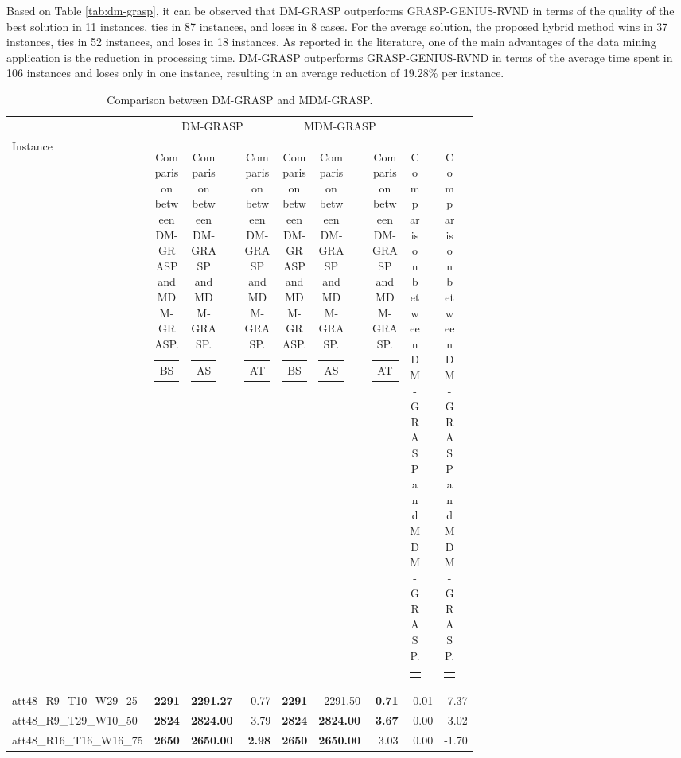 \documentclass{singlecol-new}
\begin{document}
Based on Table \ref{tab:dm-grasp}, it can be observed that DM-GRASP outperforms GRASP-GENIUS-RVND in terms of the quality of the best solution in 11 instances, ties in 87 instances, and loses in 8 cases. For the average solution, the proposed hybrid method wins in 37 instances, ties in 52 instances, and loses in 18 instances. As reported in the literature, one of the main advantages of the data mining application is the reduction in processing time. DM-GRASP outperforms GRASP-GENIUS-RVND in terms of the average time spent in 106 instances and loses only in one instance, resulting in an average reduction of 19.28\% per instance.

\begin{scriptsize}
	\begin{longtable}{lrrrrrrrr}
		\caption{Comparison between DM-GRASP and MDM-GRASP.}
		\label{tab:mdm-grasp}\\
		\hline
		& \multicolumn{3}{c}{DM-GRASP} & \multicolumn{3}{c}{MDM-GRASP} \\
		\cline{2-9}
		Instance & \begin{tabular}[c]{@{}l@{}}BS\end{tabular} & \begin{tabular}[c]{@{}l@{}}AS\end{tabular} & \begin{tabular}[r]{@{}l@{}}AT\end{tabular} & \begin{tabular}[r]{@{}l@{}}BS\end{tabular} & \begin{tabular}[c]{@{}l@{}}AS\end{tabular} & \begin{tabular}[r]{@{}l@{}}AT\end{tabular} & \begin{tabular}[c]{@{}l@{}}$Dif_{ms}$\end{tabular} & \begin{tabular}[c]{@{}l@{}}$Dif_{T}$\end{tabular} \\
		\hline
		\endhead
		att48\_R9\_T10\_W29\_25 & \textbf{2291} & \textbf{2291.27} & 0.77 & \textbf{2291} & 2291.50 & \textbf{0.71} & -0.01 & 7.37 \\
		att48\_R9\_T29\_W10\_50 & \textbf{2824} & \textbf{2824.00} & 3.79 & \textbf{2824} & \textbf{2824.00} & \textbf{3.67} & 0.00 & 3.02 \\
		att48\_R16\_T16\_W16\_75 & \textbf{2650} & \textbf{2650.00} & \textbf{2.98} & \textbf{2650} & \textbf{2650.00} & 3.03 & 0.00 & -1.70 \\

\end{longtable}
\end{scriptsize}
\end{document}
